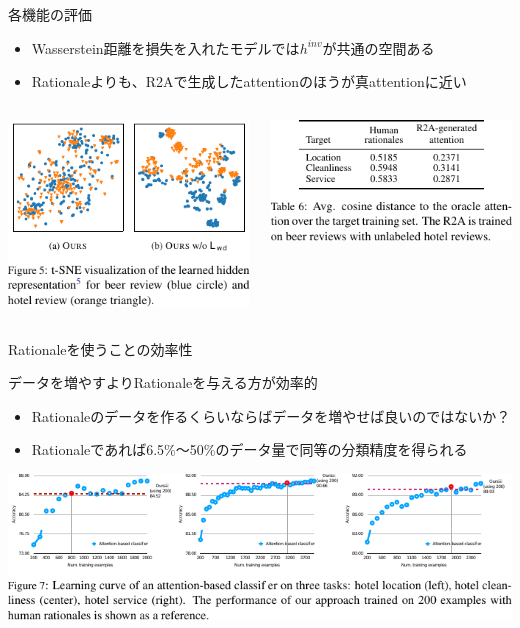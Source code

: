 \begin{frame}{各機能の評価}
\begin{itemize}
\item Wasserstein距離を損失を入れたモデルでは$h^{inv}$が共通の空間ある
\item Rationaleよりも、R2Aで生成したattentionのほうが真attentionに近い
\end{itemize}
\begin{columns}[onlytextwidth]
\begin{column}{0.48\linewidth}
\vspace*{-8pt}
\includegraphics{fig/figure5.pdf}
\end{column}
\begin{column}{0.48\linewidth}
\vspace*{-8pt}
\includegraphics{fig/table6.pdf}
\end{column}
\end{columns}
\end{frame}

\begin{frame}{Rationaleを使うことの効率性}
\begin{lead}
    データを増やすよりRationaleを与える方が効率的
\end{lead}
\begin{itemize}
\item Rationaleのデータを作るくらいならばデータを増やせば良いのではないか？
\item Rationaleであれば6.5\%〜50\%のデータ量で同等の分類精度を得られる
\end{itemize}
\vspace*{-8pt}
\includegraphics{fig/figure7.pdf}
\end{frame}



